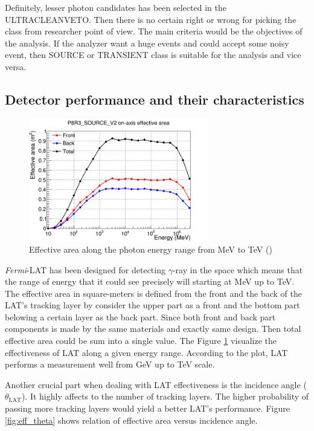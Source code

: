 Definitely, lesser photon candidates has been selected in 
the ULTRACLEANVETO. Then there is no certain right or wrong for
picking the class from researcher point of view. The main criteria 
would be the objectives of the analysis. If the analyzer want a 
huge events and could accept some noisy event, then SOURCE or 
TRANSIENT class is suitable for the analysis and vice versa.


\subsection{Detector performance and their characteristics}

\begin{figure}[h]
    \centering
    \includegraphics[width=0.7\textwidth]{content/background/figures/eff_energy.png}
    \caption{
        Effective area along the photon energy range from MeV to TeV
        (\cite{lat_p8_performance})
    }
    \label{fig:eff_energy}
\end{figure}

\textit{Fermi}-LAT has been designed for detecting $\gamma$-ray in the 
space which means that the range of energy that it could see precisely 
will starting at MeV up to TeV. The effective area in square-meters
is defined from the front and the back of the LAT's tracking layer 
by consider the upper part as a front and the bottom part belowing 
a certain layer as the back part. Since both front and back part 
components is made by the same materials and exactly same design. 
Then total effective area could be sum into a single value. 
The Figure \ref{fig:eff_energy} visualize the effectiveness of LAT 
along a given energy range. According to the plot, LAT performs 
a measurement well from GeV up to TeV scale.


Another crucial part when dealing with LAT effectiveness is the 
incidence angle ($\theta_\text{LAT}$). It highly affects to the 
number of tracking layers. The higher probability of passing more 
tracking layers would yield a better LAT's performance. Figure 
\ref{fig:eff_theta} shows relation of effective area versus 
incidence angle.


